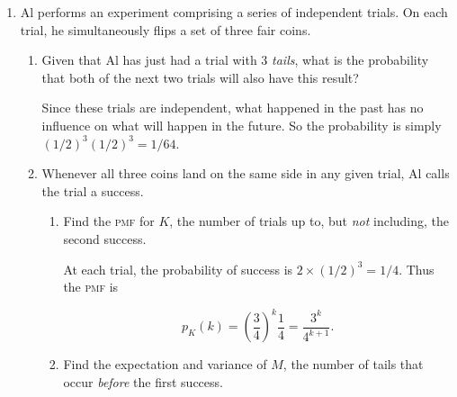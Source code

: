 \begin{enumerate}
\item Al performs an experiment comprising a series of independent
  trials.  On each trial, he simultaneously flips a set of three fair
  coins.

  \begin{enumerate} \parasp
  \item Given that Al has just had a trial with \(3\) \emph{tails},
    what is the probability that both of the next two trials will also
    have this result?

    Since these trials are independent, what happened in the past has no
    influence on what will happen in the future.  So the probability is
    simply \((1/2)^3 (1/2)^3 = 1/64\).

  \item Whenever all three coins land on the same side in any given
    trial, Al calls the trial a success. \noparasp

    \begin{enumerate} \parasp
    \item Find the \textsc{pmf} for \(K\), the number of trials up to, but
      \emph{not} including, the second success.

      At each trial, the probability of success is \(2 \times (1/2)^3 = 1/4\).
      Thus the \textsc{pmf} is

      \[ p_K(k) = \left(\frac34\right)^k \frac14 = \frac{3^k}{4^{k+1}}. \]

    \item Find the expectation and variance of \(M\), the number of tails that
      occur \emph{before} the first success.


\end{enumerate}
\end{enumerate}
\end{enumerate}
